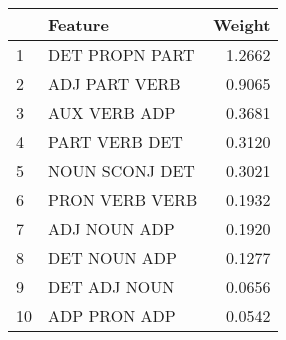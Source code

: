 \begin{tabular}{llr}
\toprule
{} &         Feature &  Weight \\
\midrule
1  &  DET PROPN PART &  1.2662 \\
2  &   ADJ PART VERB &  0.9065 \\
3  &    AUX VERB ADP &  0.3681 \\
4  &   PART VERB DET &  0.3120 \\
5  &  NOUN SCONJ DET &  0.3021 \\
6  &  PRON VERB VERB &  0.1932 \\
7  &    ADJ NOUN ADP &  0.1920 \\
8  &    DET NOUN ADP &  0.1277 \\
9  &    DET ADJ NOUN &  0.0656 \\
10 &    ADP PRON ADP &  0.0542 \\
\bottomrule
\end{tabular}
